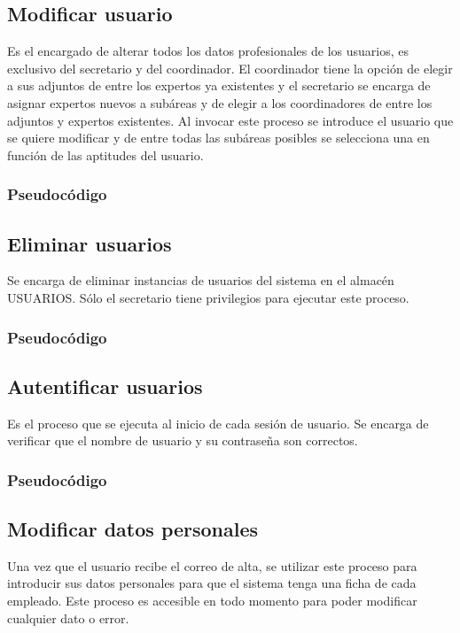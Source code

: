 \documentclass[12pt,a4paper,titlepage,spanish,twoside]{book}
\begin{document}
\subsection{Modificar usuario}
Es el encargado de alterar todos los datos profesionales de los usuarios, es
exclusivo del secretario y del coordinador. El coordinador tiene la opción de
elegir a sus adjuntos de entre los expertos ya existentes y el secretario se
encarga de asignar expertos nuevos a subáreas y de elegir a los coordinadores
de entre los adjuntos y expertos existentes. Al invocar este proceso se
introduce el usuario que se quiere modificar y de entre todas las subáreas
posibles se selecciona una en función de las aptitudes del usuario. 

\subsubsection{Pseudocódigo}


\subsection{Eliminar usuarios}
Se encarga de eliminar instancias de usuarios del sistema en el almacén 
USUARIOS. Sólo el secretario tiene privilegios para ejecutar este proceso. 

\subsubsection{Pseudocódigo}


\subsection{Autentificar usuarios}
Es el proceso que se ejecuta al inicio de cada sesión de usuario. Se encarga
de verificar que el nombre de usuario y su contraseña son correctos.

\subsubsection{Pseudocódigo}


\subsection{Modificar datos personales}
Una vez que el usuario recibe el correo de alta, se utilizar este proceso para 
introducir sus datos personales para que el sistema tenga una ficha de cada 
empleado. Este proceso es accesible en todo momento para poder modificar 
cualquier dato o error.
\end{document}
